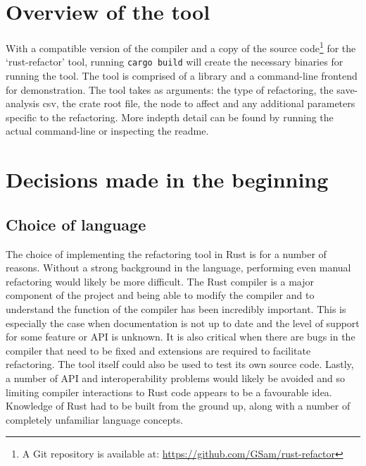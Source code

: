

\section{Overview of the tool}\label{S:iover}
With a compatible version of the compiler and a copy of the source code\footnote{A Git repository is available at: \url{https://github.com/GSam/rust-refactor}} for the `rust-refactor' tool, running {\verb|cargo build|} will create the necessary binaries for running the tool. The tool is comprised of a library and a command-line frontend for demonstration. The tool takes as arguments: the type of refactoring, the save-analysis csv, the crate root file, the node to affect and any additional parameters specific to the refactoring. More indepth detail can be found by running the actual command-line or inspecting the readme.

\section{Decisions made in the beginning}\label{S:begin}
\subsection{Choice of language}
The choice of implementing the refactoring tool in Rust is for a number of reasons. Without a strong background in the language, performing even manual refactoring would likely be more difficult. The Rust compiler is a major component of the project and being able to modify the compiler and to understand the function of the compiler has been incredibly important. This is especially the case when documentation is not up to date and the level of support for some feature or API is unknown. It is also critical when there are bugs in the compiler that need to be fixed and extensions are required to facilitate refactoring. The tool itself could also be used to test its own source code. Lastly, a number of API and interoperability problems would likely be avoided and so limiting compiler interactions to Rust code appears to be a favourable idea. Knowledge of Rust had to be built from the ground up, along with a number of completely unfamiliar language concepts.

